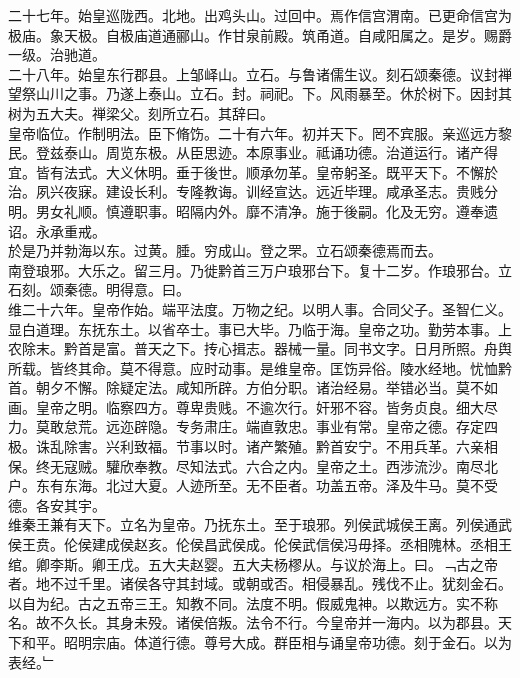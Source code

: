 \documentclass{zhvt-classic}
\begin{document}
\hspace*{2em}二十七年。始皇巡陇西。北地。出鸡头山。过回中。焉作信宫渭南。已更命信宫为极庙。象天极。自极庙道通郦山。作甘泉前殿。筑甬道。自咸阳属之。是岁。赐爵一级。治驰道。\\
\hspace*{2em}二十八年。始皇东行郡县。上邹峄山。立石。与鲁诸儒生议。刻石颂秦德。议封禅望祭山川之事。乃遂上泰山。立石。封。祠祀。下。风雨暴至。休於树下。因封其树为五大夫。禅梁父。刻所立石。其辞曰。\\
\hspace*{2em}皇帝临位。作制明法。臣下脩饬。二十有六年。初并天下。罔不宾服。亲巡远方黎民。登兹泰山。周览东极。从臣思迹。本原事业。祗诵功德。治道运行。诸产得宜。皆有法式。大义休明。垂于後世。顺承勿革。皇帝躬圣。既平天下。不懈於治。夙兴夜寐。建设长利。专隆教诲。训经宣达。远近毕理。咸承圣志。贵贱分明。男女礼顺。慎遵职事。昭隔内外。靡不清净。施于後嗣。化及无穷。遵奉遗诏。永承重戒。\\
\hspace*{2em}於是乃并勃海以东。过黄。腄。穷成山。登之罘。立石颂秦德焉而去。\\
\hspace*{2em}南登琅邪。大乐之。留三月。乃徙黔首三万户琅邪台下。复十二岁。作琅邪台。立石刻。颂秦德。明得意。曰。\\
\hspace*{2em}维二十六年。皇帝作始。端平法度。万物之纪。以明人事。合同父子。圣智仁义。显白道理。东抚东土。以省卒士。事已大毕。乃临于海。皇帝之功。勤劳本事。上农除末。黔首是富。普天之下。抟心揖志。器械一量。同书文字。日月所照。舟舆所载。皆终其命。莫不得意。应时动事。是维皇帝。匡饬异俗。陵水经地。忧恤黔首。朝夕不懈。除疑定法。咸知所辟。方伯分职。诸治经易。举错必当。莫不如画。皇帝之明。临察四方。尊卑贵贱。不逾次行。奸邪不容。皆务贞良。细大尽力。莫敢怠荒。远迩辟隐。专务肃庄。端直敦忠。事业有常。皇帝之德。存定四极。诛乱除害。兴利致福。节事以时。诸产繁殖。黔首安宁。不用兵革。六亲相保。终无寇贼。驩欣奉教。尽知法式。六合之内。皇帝之土。西涉流沙。南尽北户。东有东海。北过大夏。人迹所至。无不臣者。功盖五帝。泽及牛马。莫不受德。各安其宇。\\
\hspace*{2em}维秦王兼有天下。立名为皇帝。乃抚东土。至于琅邪。列侯武城侯王离。列侯通武侯王贲。伦侯建成侯赵亥。伦侯昌武侯成。伦侯武信侯冯毋择。丞相隗林。丞相王绾。卿李斯。卿王戊。五大夫赵婴。五大夫杨樛从。与议於海上。曰。﹁古之帝者。地不过千里。诸侯各守其封域。或朝或否。相侵暴乱。残伐不止。犹刻金石。以自为纪。古之五帝三王。知教不同。法度不明。假威鬼神。以欺远方。实不称名。故不久长。其身未殁。诸侯倍叛。法令不行。今皇帝并一海内。以为郡县。天下和平。昭明宗庙。体道行德。尊号大成。群臣相与诵皇帝功德。刻于金石。以为表经。﹂\\
\end{document}
